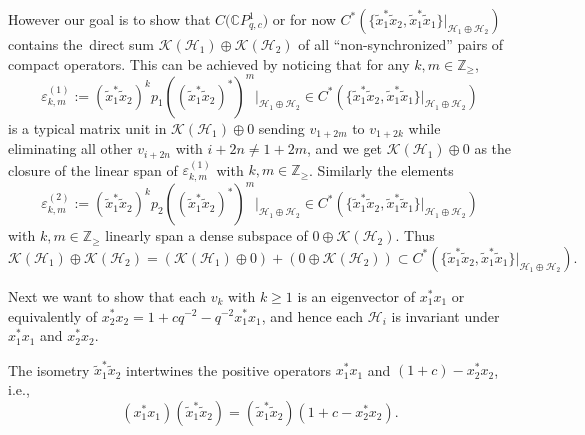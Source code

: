 \documentclass[pdftex]{sigma}
\begin{document}
However our goal is to show that $C\big(\mathbb{C}P_{q,c}^{1}\big) $ or
for now $C^{\ast} ( \{ \tilde{x}_{1}^{\ast}\tilde{x}_{2},\tilde
{x}_{1}^{\ast}\tilde{x}_{1} \} |_{\mathcal{H}_{1}\oplus\mathcal{H}_{2}
} ) $ contains the\ direct sum $\mathcal{K} ( \mathcal{H}
_{1} ) \oplus\mathcal{K}( \mathcal{H}_{2} ) $ of all
``non-synchronized'' pairs of compact
operators. This can be achieved by noticing that for any $k,m\in
\mathbb{Z}_{\geq}$,
\[
\varepsilon_{k,m}^{( 1) }:=( \tilde{x}_{1}^{\ast}\tilde
{x}_{2}) ^{k}p_{1}( ( \tilde{x}_{1}^{\ast}\tilde{x}%
_{2}) ^{\ast}) ^{m}|_{\mathcal{H}_{1}\oplus\mathcal{H}_{2}}\in
C^{\ast}( \{ \tilde{x}_{1}^{\ast}\tilde{x}_{2},\tilde{x}_{1}%
^{\ast}\tilde{x}_{1}\} |_{\mathcal{H}_{1}\oplus\mathcal{H}_{2}})
\]
is a typical matrix unit in $\mathcal{K}( \mathcal{H}_{1})
\oplus0$ sending $v_{1+2m}$ to $v_{1+2k}$ while eliminating all other
$v_{i+2n}$ with $i+2n\neq1+2m$, and we get $\mathcal{K}( \mathcal{H}%
_{1}) \oplus0$ as the closure of the linear span of $\varepsilon
_{k,m}^{( 1) }$ with $k,m\in\mathbb{Z}_{\geq}$. Similarly the
elements
\[
\varepsilon_{k,m}^{(2) }:=( \tilde{x}_{1}^{\ast}\tilde
{x}_{2}) ^{k}p_{2}( ( \tilde{x}_{1}^{\ast}\tilde{x}%
_{2}) ^{\ast}) ^{m}|_{\mathcal{H}_{1}\oplus\mathcal{H}_{2}}\in
C^{\ast}( \{ \tilde{x}_{1}^{\ast}\tilde{x}_{2},\tilde{x}_{1}%
^{\ast}\tilde{x}_{1}\} |_{\mathcal{H}_{1}\oplus\mathcal{H}_{2}})
\]
with $k,m\in\mathbb{Z}_{\geq}$ linearly span a dense subspace of
$0\oplus\mathcal{K}( \mathcal{H}_{2}) $. Thus
\[
\mathcal{K}( \mathcal{H}_{1}) \oplus\mathcal{K}(
\mathcal{H}_{2}) =( \mathcal{K}( \mathcal{H}_{1})
\oplus0) +( 0\oplus\mathcal{K}( \mathcal{H}_{2})
) \subset C^{\ast}( \{ \tilde{x}_{1}^{\ast}\tilde{x}%
_{2},\tilde{x}_{1}^{\ast}\tilde{x}_{1}\} |_{\mathcal{H}_{1}%
\oplus\mathcal{H}_{2}}) .
\]


Next we want to show that each $v_{k}$ with $k\geq1$ is an eigenvector of
$x_{1}^{\ast}x_{1}$ or equivalently of $x_{2}^{\ast}x_{2}=1+cq^{-2}%
-q^{-2}x_{1}^{\ast}x_{1}$, and hence each $\mathcal{H}_{i}$ is invariant under
$x_{1}^{\ast}x_{1}$ and $x_{2}^{\ast}x_{2}$.

\begin{proposition}\label{intertwine} The isometry $\tilde{x}_{1}^{\ast}\tilde{x}_{2}$
intertwines the positive operators $x_{1}^{\ast}x_{1}$ and $(
1+c) -x_{2}^{\ast}x_{2}$, i.e.,
\[
( x_{1}^{\ast}x_{1}) ( \tilde{x}_{1}^{\ast}\tilde{x}%
_{2}) =( \tilde{x}_{1}^{\ast}\tilde{x}_{2}) (
1+c-x_{2}^{\ast}x_{2}) .
\]
\end{proposition}
\end{document}
